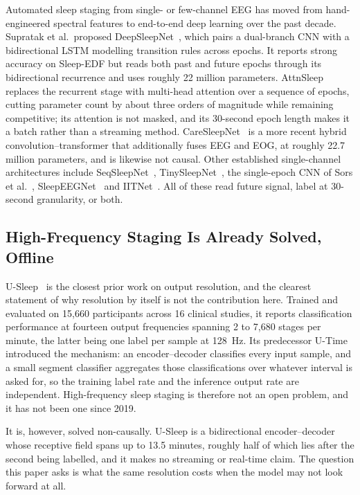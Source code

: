 \documentclass[conference]{IEEEtran}
\begin{document}
Automated sleep staging from single- or few-channel EEG has moved from hand-engineered
spectral features to end-to-end deep learning over the past decade. Supratak et
al.\ proposed DeepSleepNet~\cite{deepsleepnet}, which pairs a dual-branch CNN with a
bidirectional LSTM modelling transition rules across epochs. It reports strong accuracy on
Sleep-EDF but reads both past and future epochs through its bidirectional recurrence and
uses roughly 22 million parameters. AttnSleep~\cite{attnsleep} replaces the recurrent stage
with multi-head attention over a sequence of epochs, cutting parameter count by about three
orders of magnitude while remaining competitive; its attention is not masked, and its
30-second epoch length makes it a batch rather than a streaming method.
CareSleepNet~\cite{caresleepnet} is a more recent hybrid convolution--transformer that
additionally fuses EEG and EOG, at roughly 22.7 million parameters, and is likewise not
causal. Other established single-channel architectures include
SeqSleepNet~\cite{seqsleepnet}, TinySleepNet~\cite{tinysleepnet}, the single-epoch CNN of
Sors et al.~\cite{sors}, SleepEEGNet~\cite{sleepeegnet} and IITNet~\cite{iitnet}. All of
these read future signal, label at 30-second granularity, or both.

\subsection{High-Frequency Staging Is Already Solved, Offline}

U-Sleep~\cite{usleep} is the closest prior work on output resolution, and the clearest
statement of why resolution by itself is not the contribution here. Trained and evaluated
on 15{,}660 participants across 16 clinical studies, it reports classification performance
at fourteen output frequencies spanning 2 to 7{,}680 stages per minute, the latter being
one label per sample at 128~Hz. Its predecessor U-Time~\cite{utime} introduced the
mechanism: an encoder--decoder classifies every input sample, and a small segment
classifier aggregates those classifications over whatever interval is asked for, so the
training label rate and the inference output rate are independent. High-frequency sleep
staging is therefore not an open problem, and it has not been one since 2019.

It is, however, solved non-causally. U-Sleep is a bidirectional encoder--decoder whose
receptive field spans up to 13.5 minutes, roughly half of which lies after the second being
labelled, and it makes no streaming or real-time claim. The question this paper asks is
what the same resolution costs when the model may not look forward at all.
\end{document}

